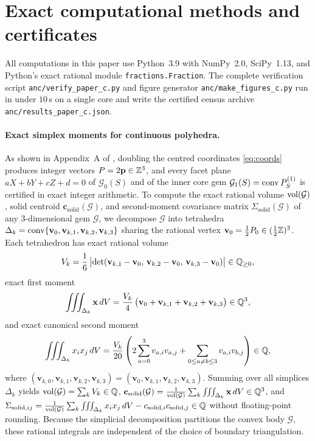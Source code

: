 \section{Exact computational methods and certificates}
\label{sec:appendix}

All computations in this paper use Python~3.9 with NumPy~2.0, SciPy~1.13, and Python's exact rational module \texttt{fractions.Fraction}. The complete verification script \texttt{anc/verify\_paper\_c.py} and figure generator \texttt{anc/make\_figures\_c.py} run in under $10$\,s on a single core and write the certified census archive \texttt{anc/results\_paper\_c.json}.

\paragraph{Exact simplex moments for continuous polyhedra.}
As shown in Appendix~A of \citet{mathewson2026gems}, doubling the centred coordinates \eqref{eq:coords} produces integer vectors $P=2\mathbf p\in\mathbb{Z}^3$, and every facet plane $aX+bY+cZ+d=0$ of $\mathcal G_0(S)$ and of the inner core gem $\mathcal G_1(S)=\operatorname{conv} P_S^{(1)}$ is certified in exact integer arithmetic. To compute the exact rational volume $\operatorname{vol}(\mathcal G)$, solid centroid $\mathbf c_{\mathrm{solid}}(\mathcal G)$, and second-moment covariance matrix $\Sigma_{\mathrm{solid}}(\mathcal G)$ of any 3-dimensional gem $\mathcal G$, we decompose $\mathcal G$ into tetrahedra $\Delta_k=\operatorname{conv}\{\mathbf v_0,\mathbf v_{k,1},\mathbf v_{k,2},\mathbf v_{k,3}\}$ sharing the rational vertex $\mathbf v_0=\frac12 P_0\in(\frac12\mathbb{Z})^3$. Each tetrahedron has exact rational volume
\[
V_k = \frac{1}{6}\,\bigl|\det(\mathbf v_{k,1}-\mathbf v_0,\, \mathbf v_{k,2}-\mathbf v_0,\, \mathbf v_{k,3}-\mathbf v_0)\bigr| \in \mathbb{Q}_{\ge0},
\]
exact first moment
\[
\iiint_{\Delta_k} \mathbf x\,dV = \frac{V_k}{4}\,\bigl(\mathbf v_0 + \mathbf v_{k,1} + \mathbf v_{k,2} + \mathbf v_{k,3}\bigr) \in \mathbb{Q}^3,
\]
and exact canonical second moment
\[
\iiint_{\Delta_k} x_i x_j\,dV = \frac{V_k}{20}\left(2\sum_{a=0}^3 v_{a,i}v_{a,j} + \sum_{0\le a\ne b\le3} v_{a,i}v_{b,j}\right) \in \mathbb{Q},
\]
where $(\mathbf v_{k,0},\mathbf v_{k,1},\mathbf v_{k,2},\mathbf v_{k,3})=(\mathbf v_0,\mathbf v_{k,1},\mathbf v_{k,2},\mathbf v_{k,3})$. Summing over all simplices $\Delta_k$ yields $\operatorname{vol}(\mathcal G)=\sum_k V_k\in\mathbb{Q}$, $\mathbf c_{\mathrm{solid}}(\mathcal G)=\frac{1}{\operatorname{vol}(\mathcal G)}\sum_k\iiint_{\Delta_k}\mathbf x\,dV\in\mathbb{Q}^3$, and $\Sigma_{\mathrm{solid},ij}=\frac{1}{\operatorname{vol}(\mathcal G)}\sum_k\iiint_{\Delta_k}x_ix_j\,dV - c_{\mathrm{solid},i}c_{\mathrm{solid},j}\in\mathbb{Q}$ without floating-point rounding. Because the simplicial decomposition partitions the convex body $\mathcal G$, these rational integrals are independent of the choice of boundary triangulation.

